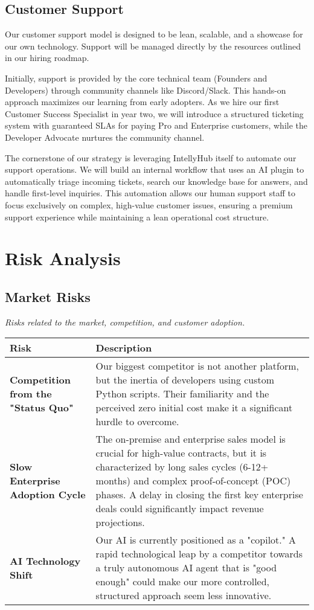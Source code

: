 \subsection{Customer Support}
Our customer support model is designed to be lean, scalable, and a showcase for our own technology. Support will be managed directly by the resources outlined in our hiring roadmap.

Initially, support is provided by the core technical team (Founders and Developers) through community channels like Discord/Slack. This hands-on approach maximizes our learning from early adopters. As we hire our first Customer Success Specialist in year two, we will introduce a structured ticketing system with guaranteed SLAs for paying Pro and Enterprise customers, while the Developer Advocate nurtures the community channel.

The cornerstone of our strategy is leveraging IntellyHub itself to automate our support operations. We will build an internal workflow that uses an AI plugin to automatically triage incoming tickets, search our knowledge base for answers, and handle first-level inquiries. This automation allows our human support staff to focus exclusively on complex, high-value customer issues, ensuring a premium support experience while maintaining a lean operational cost structure.


\section{Risk Analysis}
\subsection{Market Risks}
\textit{Risks related to the market, competition, and customer adoption.}

\begin{table}[H]
\centering
\begin{tabularx}{\textwidth}{@{}lL@{}}
\toprule
\textbf{Risk} & \textbf{Description} \\
\midrule
\textbf{Competition from the "Status Quo"} & Our biggest competitor is not another platform, but the inertia of developers using custom Python scripts. Their familiarity and the perceived zero initial cost make it a significant hurdle to overcome. \\
\addlinespace
\textbf{Slow Enterprise Adoption Cycle} & The on-premise and enterprise sales model is crucial for high-value contracts, but it is characterized by long sales cycles (6-12+ months) and complex proof-of-concept (POC) phases. A delay in closing the first key enterprise deals could significantly impact revenue projections. \\
\addlinespace
\textbf{AI Technology Shift} & Our AI is currently positioned as a "copilot." A rapid technological leap by a competitor towards a truly autonomous AI agent that is "good enough" could make our more controlled, structured approach seem less innovative. \\
\bottomrule
\end{tabularx}
\end{table}

